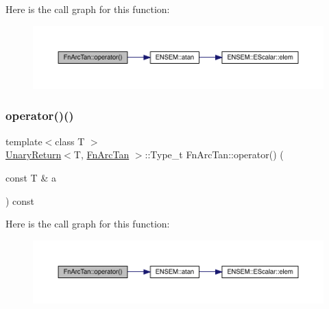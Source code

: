 Here is the call graph for this function\+:
\nopagebreak
\begin{figure}[H]
\begin{center}
\leavevmode
\includegraphics[width=350pt]{df/dc4/structFnArcTan_a7e6a58ff73a64fb87d8a8a232050a225_cgraph}
\end{center}
\end{figure}
\mbox{\label{structFnArcTan_a7e6a58ff73a64fb87d8a8a232050a225}} 
\subsubsection{\texorpdfstring{operator()()}{operator()()}\hspace{0.1cm}{\footnotesize\ttfamily [2/3]}}
{\footnotesize\ttfamily template$<$class T $>$ \\
\mbox{\hyperlink{structUnaryReturn}{Unary\+Return}}$<$T, \mbox{\hyperlink{structFnArcTan}{Fn\+Arc\+Tan}} $>$\+::Type\+\_\+t Fn\+Arc\+Tan\+::operator() (\begin{DoxyParamCaption}\item[{const T \&}]{a }\end{DoxyParamCaption}) const\hspace{0.3cm}{\ttfamily [inline]}}

Here is the call graph for this function\+:
\nopagebreak
\begin{figure}[H]
\begin{center}
\leavevmode
\includegraphics[width=350pt]{df/dc4/structFnArcTan_a7e6a58ff73a64fb87d8a8a232050a225_cgraph}
\end{center}
\end{figure}
\mbox{\label{structFnArcTan_a7e6a58ff73a64fb87d8a8a232050a225}} 
